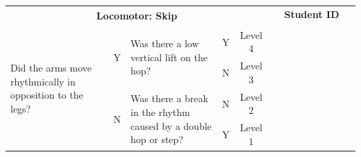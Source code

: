 \documentclass[
  letterpaper,
  DIV=11,
  numbers=noendperiod]{scrartcl}
\begin{document}
\begin{tabular}{|p{5.5cm}|c|p{5.5cm}|c|c|*{9}{p{1.07cm}|}}
\hline
\multicolumn{5}{|c|}{\multirow{2}{*}{\centering \textbf{Locomotor: Skip}}} & \multicolumn{9}{c|}{\textbf{Student ID}} \\ 
\cline{6-14}
\multicolumn{5}{|c|}{} & & & & & & & & & \\
\hline
\multirow{4}{5.5cm}{\raggedright {\footnotesize Did the arms move rhythmically in opposition to the legs?}} 
& \multirow{2}{*}{\footnotesize Y} 
& \multirow{2}{5cm}{\raggedright {\footnotesize Was there a low vertical lift on the hop?}} & {\footnotesize Y} & {\footnotesize Level 4} & & & & & & & & & \\
\cline{4-14}
& & & {\footnotesize N} & {\footnotesize Level 3} & & & & & & & & & \\
\cline{2-14}
& \multirow{2}{*}{\footnotesize N} & \multirow{2}{5cm}{\raggedright {\footnotesize Was there a break in the rhythm caused by a double hop or step?}} & {\footnotesize N} & {\footnotesize Level 2} & & & & & & & & & \\
\cline{4-14}
& & & {\footnotesize Y} & {\footnotesize Level 1} & & & & & & & & & \\
\hline
\end{tabular}

\vspace{.5em}
\end{document}
